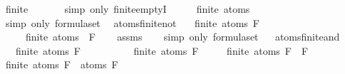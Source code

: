 \begin{isabellebody}
\ {\isachardoublequoteopen}finite\ {\isasymemptyset}{\isachardoublequoteclose}\isanewline
\ \ \ \ \isamarkupfalse%
\ {\isacharparenleft}simp\ only{\isacharcolon}\ finite{\isachardot}emptyI{\isacharparenright}\isanewline
\ \ \isamarkupfalse%
\ \isamarkupfalse%
\ {\isachardoublequoteopen}finite\ {\isacharparenleft}atoms\ {\isasymbottom}{\isacharparenright}{\isachardoublequoteclose}\isanewline
\ \ \ \ \isamarkupfalse%
\ {\isacharparenleft}simp\ only{\isacharcolon}\ formula{\isachardot}set{\isacharparenleft}{}{\isacharparenright}{\isacharparenright}\ \isanewline
{}\isamarkupfalse%
%
\endisatagproof
{\isafoldproof}%
%
\isadelimproof
\isanewline
%
\endisadelimproof
\isanewline
{}\isamarkupfalse%
\ atoms{\isacharunderscore}finite{\isacharunderscore}not{\isacharcolon}\isanewline
\ \ \ {\isachardoublequoteopen}finite\ {\isacharparenleft}atoms\ F{\isacharparenright}{\isachardoublequoteclose}\ \isanewline
\ \ \ \ \ {\isachardoublequoteopen}finite\ {\isacharparenleft}atoms\ {\isacharparenleft}\isactrlbold {\isasymnot}\ F{\isacharparenright}{\isacharparenright}{\isachardoublequoteclose}\isanewline
%
\isadelimproof
\ \ %
\endisadelimproof
%
\isatagproof
{}\isamarkupfalse%
\ assms\isanewline
\ \ \isamarkupfalse%
\ {\isacharparenleft}simp\ only{\isacharcolon}\ formula{\isachardot}set{\isacharparenleft}{}{\isacharparenright}{\isacharparenright}%
\endisatagproof
{\isafoldproof}%
%
\isadelimproof
\ \isanewline
%
\endisadelimproof
\isanewline
{}\isamarkupfalse%
\ atoms{\isacharunderscore}finite{\isacharunderscore}and{\isacharcolon}\isanewline
\ \ \ {\isachardoublequoteopen}finite\ {\isacharparenleft}atoms\ F{}{\isacharparenright}{\isachardoublequoteclose}\isanewline
\ \ \ \ \ \ \ \ \ \ {\isachardoublequoteopen}finite\ {\isacharparenleft}atoms\ F{}{\isacharparenright}{\isachardoublequoteclose}\isanewline
\ \ \ \ \ {\isachardoublequoteopen}finite\ {\isacharparenleft}atoms\ {\isacharparenleft}F{}\ \isactrlbold {\isasymand}\ F{}{\isacharparenright}{\isacharparenright}{\isachardoublequoteclose}\isanewline
%
\isadelimproof
%
\endisadelimproof
%
\isatagproof
{}\isamarkupfalse%
\ {\isacharminus}\isanewline
\ \ \isamarkupfalse%
\ {\isachardoublequoteopen}finite\ {\isacharparenleft}atoms\ F{}\ {\isasymunion}\ atoms\ F{}{\isacharparenright}{\isachardoublequoteclose}\isanewline

\end{isabellebody}
